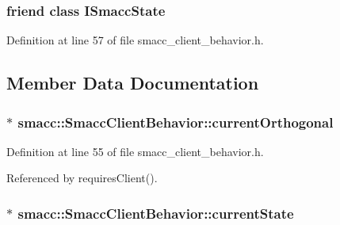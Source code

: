 \subsubsection[{\texorpdfstring{I\+Smacc\+State}{ISmaccState}}]{\setlength{\rightskip}{0pt plus 5cm}friend class {\bf I\+Smacc\+State}\hspace{0.3cm}{\ttfamily [friend]}}\hypertarget{classsmacc_1_1SmaccClientBehavior_ab907e4cdbf326246355f56640780162e}{}\label{classsmacc_1_1SmaccClientBehavior_ab907e4cdbf326246355f56640780162e}


Definition at line 57 of file smacc\+\_\+client\+\_\+behavior.\+h.



\subsection{Member Data Documentation}
\subsubsection[{\texorpdfstring{current\+Orthogonal}{currentOrthogonal}}]{$\ast$ smacc\+::\+Smacc\+Client\+Behavior\+::current\+Orthogonal\hspace{0.3cm}{\ttfamily [private]}}\hypertarget{classsmacc_1_1SmaccClientBehavior_a37e6a2fe61c3a72ed2f3e4180f552089}{}\label{classsmacc_1_1SmaccClientBehavior_a37e6a2fe61c3a72ed2f3e4180f552089}


Definition at line 55 of file smacc\+\_\+client\+\_\+behavior.\+h.



Referenced by requires\+Client().

\subsubsection[{\texorpdfstring{current\+State}{currentState}}]{$\ast$ smacc\+::\+Smacc\+Client\+Behavior\+::current\+State\hspace{0.3cm}{\ttfamily [private]}}\hypertarget{classsmacc_1_1SmaccClientBehavior_af76fc9b877542ed5caf033f820c107d0}{}\label{classsmacc_1_1SmaccClientBehavior_af76fc9b877542ed5caf033f820c107d0}


